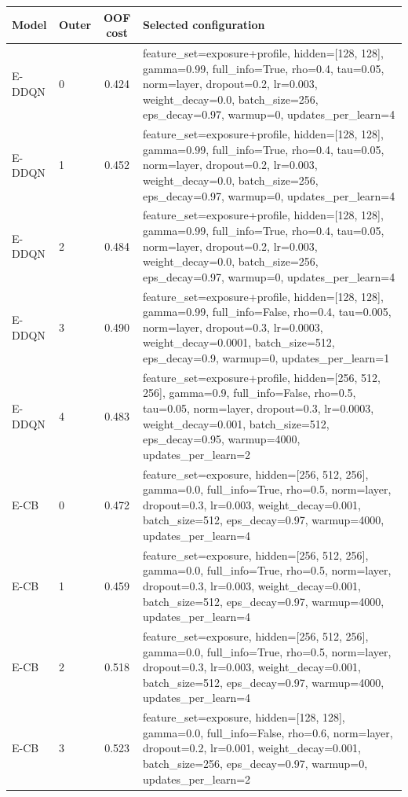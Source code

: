 \begin{longtable}{llcp{}}
\toprule
Model & Outer & OOF cost & Selected configuration \\
\midrule
\endhead
E-DDQN & 0 & 0.424 & \footnotesize feature\_set=exposure+profile, hidden=[128, 128], gamma=0.99, full\_info=True, rho=0.4, tau=0.05, norm=layer, dropout=0.2, lr=0.003, weight\_decay=0.0, batch\_size=256, eps\_decay=0.97, warmup=0, updates\_per\_learn=4 \\
E-DDQN & 1 & 0.452 & \footnotesize feature\_set=exposure+profile, hidden=[128, 128], gamma=0.99, full\_info=True, rho=0.4, tau=0.05, norm=layer, dropout=0.2, lr=0.003, weight\_decay=0.0, batch\_size=256, eps\_decay=0.97, warmup=0, updates\_per\_learn=4 \\
E-DDQN & 2 & 0.484 & \footnotesize feature\_set=exposure+profile, hidden=[128, 128], gamma=0.99, full\_info=True, rho=0.4, tau=0.05, norm=layer, dropout=0.2, lr=0.003, weight\_decay=0.0, batch\_size=256, eps\_decay=0.97, warmup=0, updates\_per\_learn=4 \\
E-DDQN & 3 & 0.490 & \footnotesize feature\_set=exposure+profile, hidden=[128, 128], gamma=0.99, full\_info=False, rho=0.4, tau=0.005, norm=layer, dropout=0.3, lr=0.0003, weight\_decay=0.0001, batch\_size=512, eps\_decay=0.9, warmup=0, updates\_per\_learn=1 \\
E-DDQN & 4 & 0.483 & \footnotesize feature\_set=exposure+profile, hidden=[256, 512, 256], gamma=0.9, full\_info=False, rho=0.5, tau=0.05, norm=layer, dropout=0.3, lr=0.0003, weight\_decay=0.001, batch\_size=512, eps\_decay=0.95, warmup=4000, updates\_per\_learn=2 \\
E-CB & 0 & 0.472 & \footnotesize feature\_set=exposure, hidden=[256, 512, 256], gamma=0.0, full\_info=True, rho=0.5, norm=layer, dropout=0.3, lr=0.003, weight\_decay=0.001, batch\_size=512, eps\_decay=0.97, warmup=4000, updates\_per\_learn=4 \\
E-CB & 1 & 0.459 & \footnotesize feature\_set=exposure, hidden=[256, 512, 256], gamma=0.0, full\_info=True, rho=0.5, norm=layer, dropout=0.3, lr=0.003, weight\_decay=0.001, batch\_size=512, eps\_decay=0.97, warmup=4000, updates\_per\_learn=4 \\
E-CB & 2 & 0.518 & \footnotesize feature\_set=exposure, hidden=[256, 512, 256], gamma=0.0, full\_info=True, rho=0.5, norm=layer, dropout=0.3, lr=0.003, weight\_decay=0.001, batch\_size=512, eps\_decay=0.97, warmup=4000, updates\_per\_learn=4 \\
E-CB & 3 & 0.523 & \footnotesize feature\_set=exposure, hidden=[128, 128], gamma=0.0, full\_info=False, rho=0.6, norm=layer, dropout=0.2, lr=0.001, weight\_decay=0.001, batch\_size=256, eps\_decay=0.97, warmup=0, updates\_per\_learn=2 \\

\end{longtable}
